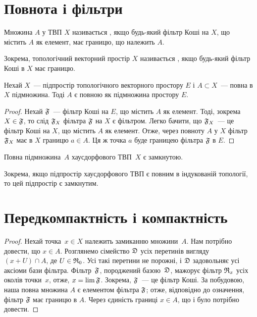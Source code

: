 \section{Повнота і фільтри}

\begin{definition}
    Множина $A$ у ТВП $X$ називається , якщо будь-який фільтр Коші на $X$, що містить $A$ як елемент, має границю, що належить $A$.
\end{definition}

\begin{remark}
    Зокрема, топологічний векторний простір $X$ називається , якщо будь-який фільтр Коші в $X$ має границю.
\end{remark}

\begin{theorem}
    Нехай $X$~--- підпростір топологічного векторного простору $E$ і $A \subset X$~--- повна в $X$ підмножина. Тоді $A$ є повною як підмножина простору $E$.
\end{theorem}

\begin{proof}
    Нехай $\frak F$~--- фільтр Коші на $E$, що містить $A$ як елемент. Тоді, зокрема $X \in \frak F$, то слід $\frak F_X$ фільтра $\frak F$ на $X$ є фільтром. Легко бачити, що $\frak F_X$~--- це фільтр Коші на $X$, що містить $A$ як елемент. Отже, через повноту $A$ у $X$ фільтр $\frak F_X$ має в $X$ границю $a \in A$. Ця ж точка $a$ буде границею фільтра $\frak F$ в $E$.
\end{proof}

\begin{theorem}
    Повна підмножина~$A$ хаусдорфового ТВП~$X$ є замкнутою.
\end{theorem}

\begin{remark}
    Зокрема, якщо підпростір хаусдорфового ТВП є повним в індукованій топології, то цей підпростір є замкнутим.
\end{remark}

\section{Передкомпактність і компактність}

\begin{proof}
    Нехай точка~$x \in X$ належить замиканню множини~$A$. Нам потрібно довести, що $x \in A$. Розглянемо сімейство $\frak D$ усіх перетинів вигляду $(x + U) \cap A$, де $U \in \frak R_0$. Усі такі перетини не порожні, і $\frak D$ задовольняє усі аксіоми бази фільтра. Фільтр~$\frak F$, породжений базою~$\frak D$, мажорує фільтр $\frak R_x$ усіх околів точки~$x$, отже, $x = \lim \frak F$. Зокрема, $\frak F$~--- це фільтр Коші. За побудовою, наша повна множина $A$ є елементом фільтра $\frak F$; отже, відповідно до означення, фільтр $\frak F$ має границю в $A$. Через єдиність границі $x \in A$, що і було потрібно довести.
\end{proof}

